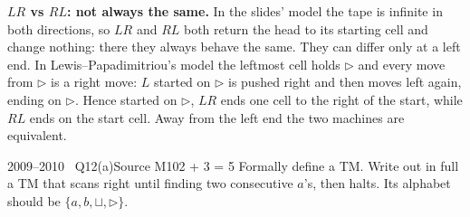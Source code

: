 \documentclass[11pt,a4paper]{article}
\begin{document}
\begin{solution}
\textbf{$LR$ vs $RL$: not always the same.} In the slides' model the tape is infinite in both directions, so $LR$ and $RL$ both return the head to its starting cell and change nothing: there they always behave the same. They can differ only at a left end. In Lewis--Papadimitriou's model the leftmost cell holds $\triangleright$ and every move from $\triangleright$ is a right move: $L$ started on $\triangleright$ is pushed right and then moves left again, ending on $\triangleright$. Hence started on $\triangleright$, $LR$ ends one cell to the right of the start, while $RL$ ends on the start cell. Away from the left end the two machines are equivalent.
\end{solution}

\begin{question}{2009--2010 \textbullet\ Q12(a)}{Source M10}{2 + 3 = 5}
Formally define a TM. Write out in full a TM that scans right until finding two consecutive $a$'s, then halts. Its alphabet should be $\{a,b,\sqcup,\triangleright\}$.
\end{question}
\end{document}
